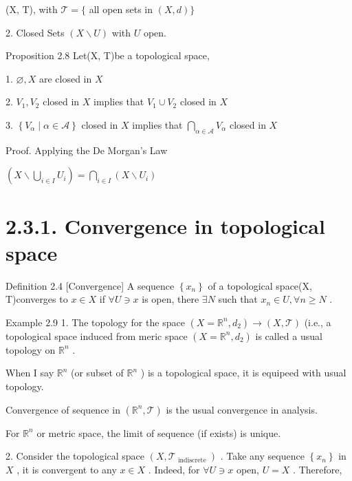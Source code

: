 (X, T), with \(\mathcal{T} = \{\) all open sets in \(\left( {X,d}\right) \}\)

2. Closed Sets \(\left( {X \smallsetminus  U}\right)\) with \(U\) open.

Proposition 2.8 Let(X, T)be a topological space,

1. \(\varnothing ,X\) are closed in \(X\)

2. \({V}_{1},{V}_{2}\) closed in \(X\) implies that \({V}_{1} \cup  {V}_{2}\) closed in \(X\)

3. \(\left\{  {{V}_{\alpha } \mid  \alpha  \in  \mathcal{A}}\right\}\) closed in \(X\) implies that \(\mathop{\bigcap }\limits_{{\alpha  \in  \mathcal{A}}}{V}_{\alpha }\) closed in \(X\)

Proof. Applying the De Morgan's Law

\(\left( {X \smallsetminus  \mathop{\bigcup }\limits_{{i \in  I}}{U}_{i}}\right)  = \mathop{\bigcap }\limits_{{i \in  I}}\left( {X \smallsetminus  {U}_{i}}\right)\)

\section*{2.3.1. Convergence in topological space}

Definition 2.4 [Convergence] A sequence \(\left\{  {x}_{n}\right\}\) of a topological space(X, T)converges to \(x \in  X\) if \(\forall U \ni  x\) is open, there \(\exists N\) such that \({x}_{n} \in  U,\forall n \geq  N\) .

Example 2.9 1. The topology for the space \(\left( {X = {\mathbb{R}}^{n},{d}_{2}}\right)  \rightarrow  \left( {X,\mathcal{T}}\right)\) (i.e., a topological space induced from meric space \(\left( {X = {\mathbb{R}}^{n},{d}_{2}}\right)\) is called a usual topology on \({\mathbb{R}}^{n}\) .

When I say \({\mathbb{R}}^{n}\) (or subset of \({\mathbb{R}}^{n}\) ) is a topological space, it is equipeed with usual topology.

Convergence of sequence in \(\left( {{\mathbb{R}}^{n},\mathcal{T}}\right)\) is the usual convergence in analysis.

For \({\mathbb{R}}^{n}\) or metric space, the limit of sequence (if exists) is unique.

2. Consider the topological space \(\left( {X,{\mathcal{T}}_{\text{ indiscrete }}}\right)\) . Take any sequence \(\left\{  {x}_{n}\right\}\) in \(X\) , it is convergent to any \(x \in  X\) . Indeed, for \(\forall U \ni  x\) open, \(U = X\) . Therefore,


